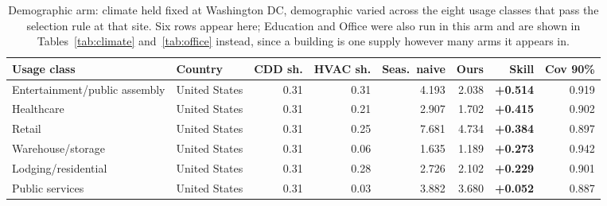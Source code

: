 \begin{table}[t]
\centering
\footnotesize
\setlength{\tabcolsep}{3.5pt}
\begin{tabular}{llrrrrrr}
\toprule
Usage class & Country & CDD sh. & HVAC sh. & Seas.\ naive & Ours & Skill & Cov 90\% \\
\midrule
Entertainment/public assembly & United States & 0.31 & 0.31 & 4.193 & 2.038 & \textbf{+0.514} & 0.919 \\
Healthcare & United States & 0.31 & 0.21 & 2.907 & 1.702 & \textbf{+0.415} & 0.902 \\
Retail & United States & 0.31 & 0.25 & 7.681 & 4.734 & \textbf{+0.384} & 0.897 \\
Warehouse/storage & United States & 0.31 & 0.06 & 1.635 & 1.189 & \textbf{+0.273} & 0.942 \\
Lodging/residential & United States & 0.31 & 0.28 & 2.726 & 2.102 & \textbf{+0.229} & 0.901 \\
Public services & United States & 0.31 & 0.03 & 3.882 & 3.680 & \textbf{+0.052} & 0.887 \\
\bottomrule
\end{tabular}
\caption{Demographic arm: climate held fixed at Washington DC, demographic varied across the eight usage classes that pass the selection rule at that site. Six rows appear here; Education and Office were also run in this arm and are shown in Tables~\ref{tab:climate} and~\ref{tab:office} instead, since a building is one supply however many arms it appears in.}
\label{tab:demographic}
\end{table}
